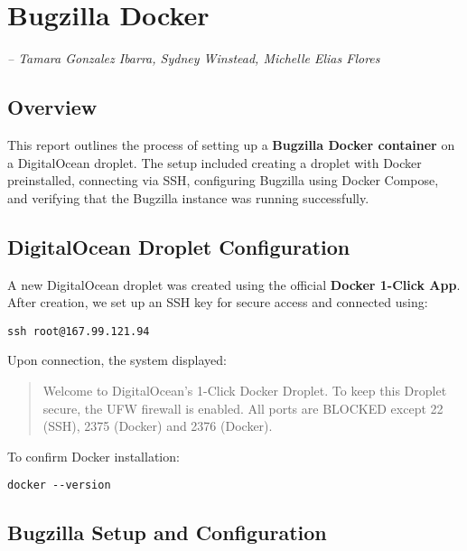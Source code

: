 \chapter{Bugzilla Docker}
\label{Chapter::itBugzillaDocker}

\begin{flushleft}
\small{\textit{-- Tamara Gonzalez Ibarra, Sydney Winstead, Michelle Elias Flores}}
\end{flushleft}

\section{Overview}
This report outlines the process of setting up a \textbf{Bugzilla Docker container} on a DigitalOcean droplet. The setup included creating a droplet with Docker preinstalled, connecting via SSH, configuring Bugzilla using Docker Compose, and verifying that the Bugzilla instance was running successfully.

\section{DigitalOcean Droplet Configuration}

A new DigitalOcean droplet was created using the official \textbf{Docker 1-Click App}.  
After creation, we set up an SSH key for secure access and connected using:

\begin{verbatim}
ssh root@167.99.121.94
\end{verbatim}

Upon connection, the system displayed:

\begin{quote}
Welcome to DigitalOcean's 1-Click Docker Droplet.  
To keep this Droplet secure, the UFW firewall is enabled.  
All ports are BLOCKED except 22 (SSH), 2375 (Docker) and 2376 (Docker).
\end{quote}

To confirm Docker installation:

\begin{verbatim}
docker --version
\end{verbatim}

\section{Bugzilla Setup and Configuration}

